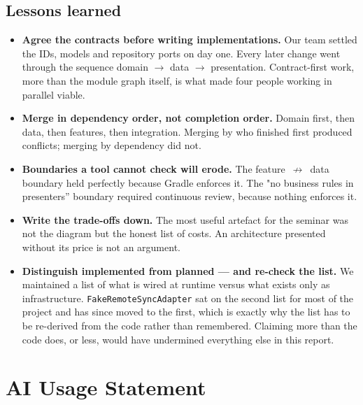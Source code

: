 \documentclass[11pt,a4paper]{article}
\newcommand{\file}[1]{{\small\texttt{#1}}}
\begin{document}
\subsection{Lessons learned}

\begin{itemize}[leftmargin=*]
  \item \textbf{Agree the contracts before writing implementations.} Our team
        settled the IDs, models and repository ports on day one. Every later
        change went through the sequence domain $\rightarrow$ data $\rightarrow$
        presentation. Contract-first work, more than the module graph itself, is
        what made four people working in parallel viable.
  \item \textbf{Merge in dependency order, not completion order.} Domain first,
        then data, then features, then integration. Merging by who finished first
        produced conflicts; merging by dependency did not.
  \item \textbf{Boundaries a tool cannot check will erode.} The
        feature~$\nrightarrow$~data boundary held perfectly because Gradle
        enforces it. The "no business rules in presenters'' boundary required
        continuous review, because nothing enforces it.
  \item \textbf{Write the trade-offs down.} The most useful artefact for the
        seminar was not the diagram but the honest list of costs. An architecture
        presented without its price is not an argument.
  \item \textbf{Distinguish implemented from planned --- and re-check the list.}
        We maintained a list of what is wired at runtime versus what exists only
        as infrastructure. \file{FakeRemoteSyncAdapter} sat on the second list
        for most of the project and has since moved to the first, which is
        exactly why the list has to be re-derived from the code rather than
        remembered. Claiming more than the code does, or less, would have
        undermined everything else in this report.
\end{itemize}

\section{AI Usage Statement}

\end{document}
